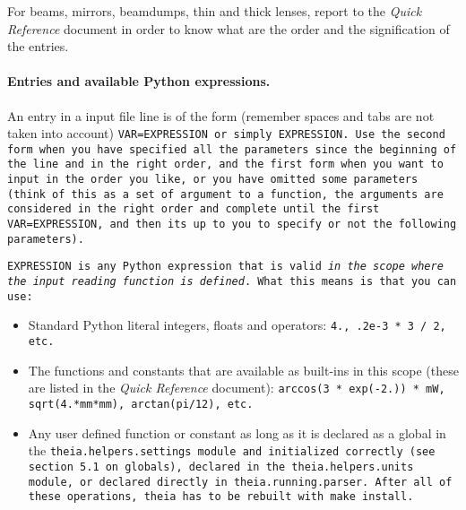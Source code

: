 \documentclass{article}
\begin{document}
For beams, mirrors, beamdumps, thin and thick lenses, report to the \textit{Quick Reference} document in order to know what are the order and the signification of the entries.

\paragraph{Entries and available Python expressions.}An entry in a input file line is of the form (remember spaces and tabs are not taken into account) \tt{VAR=EXPRESSION} or simply \tt{EXPRESSION}. Use the second form when you have specified all the parameters since the beginning of the line and in the right order, and the first form when you want to input in the order you like, or you have omitted some parameters (think of this as a set of argument to a function, the arguments are considered in the right order and complete until the first \tt{VAR=EXPRESSION}, and then its up to you to specify or not the following parameters). 

\tt{EXPRESSION} is any Python expression that is valid \textit{in the scope where the input reading function is defined}. What this means is that you can use:
\begin{itemize}
\item Standard Python literal integers, floats and operators: \tt{4.}, \tt{.2e-3 * 3 / 2}, etc.
\item The functions and constants that are available as built-ins in this scope (these are listed in the \textit{Quick Reference} document): \tt{arccos(3 * exp(-2.)) * mW}, \tt{sqrt(4.*mm*mm)}, \tt{arctan(pi/12)}, etc.
\item Any user defined function or constant as long as it is declared as a global in the \tt{theia.helpers.settings} module and initialized correctly (see section 5.1 on globals), declared in the \tt{theia.helpers.units} module, or declared directly in \tt{theia.running.parser}. After all of these operations, \tt{theia} has to be rebuilt with \tt{make install}.
\end{itemize}




\end{document}
